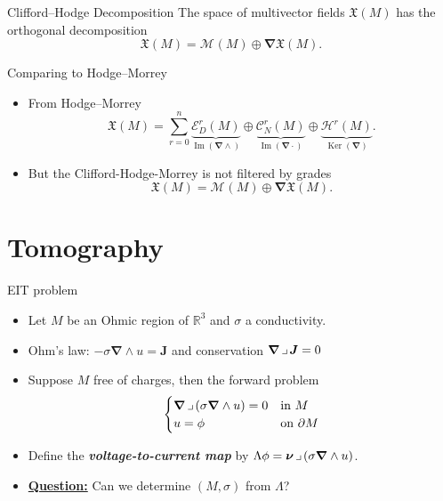 \documentclass[aspectratio=169]{beamer}
\newcommand\boldgreen[1]{\textcolor{lighter_csu_green}{\emph{\textbf{#1}}}}
\newcommand{\R}{\mathbb{R}}
\newcommand{\grad}{\boldsymbol{\nabla}}
\newcommand{\blade}[1]{\boldsymbol{#1}}
\newcommand{\normal}{\blade{\nu}}
\newcommand{\contract}{\hspace*{.5mm} \lrcorner \hspace*{.5mm}}
\newcommand{\monogenicfields}[1]{\mathcal{M}^{#1}(M)}
\newcommand{\smoothfields}{\mathfrak{X}}
\begin{document}
\begin{frame}{}
\vfill
\begin{thm*}{Clifford--Hodge Decomposition}{}
The space of multivector fields $\smoothfields(M)$ has the orthogonal decomposition
\[
\smoothfields(M) = \monogenicfields{} \oplus \grad \smoothfields(M).
\]
\end{thm*}
\vfill
\end{frame}

\begin{frame}{Comparing to Hodge--Morrey}
\vfill
\begin{itemize}
\pause
\item From Hodge--Morrey
\[
\smoothfields(M) = \sum_{r=0}^n \underbrace{\mathcal{E}_D^r(M)}_{\operatorname{Im}(\grad \wedge)} \oplus \underbrace{\mathcal{C}_N^r(M)}_{\operatorname{Im}(\grad \cdot)} \oplus \underbrace{\mathcal{H}^r(M)}_{\operatorname{Ker}(\grad)}.
\]
\pause
\item But the Clifford-Hodge-Morrey is not filtered by grades
\[
\smoothfields(M) = \monogenicfields{} \oplus \grad \smoothfields(M).
\]
\end{itemize}
\vfill
\end{frame}

\section{Tomography}


\begin{frame}{EIT problem}
\vfill
\begin{itemize}
\pause
\item Let $M$ be an Ohmic region of $\R^3$ and $\sigma$ a conductivity.
\pause
\item Ohm's law: $-\sigma \grad\wedge u =\blade{J}$ and conservation $\grad \contract \blade{J}=0$
\pause
\item Suppose $M$ free of charges, then the forward problem
\[
\begin{cases}
\grad \contract (\sigma \grad \wedge u) = 0 & \textrm{in $M$}\\
u = \phi & \textrm{on $\partial M$}
\end{cases}
\]
\pause
\item Define the \boldgreen{voltage-to-current map} by $\Lambda\phi = \normal \contract (\sigma \grad \wedge u)$.
\pause
\item \textbf{\underline{Question:}} Can we determine $(M,\sigma)$ from $\Lambda$?
\end{itemize}
\vfill
\end{frame}
\end{document}

